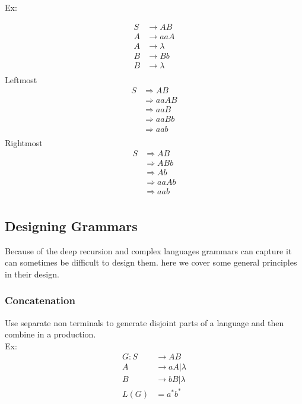 \documentclass[11pt]{exam}
\begin{document}
Ex:
\begin{center}
\begin{align*}
S &\rightarrow AB\\
A &\rightarrow aaA\\
A &\rightarrow \lambda\\
B &\rightarrow Bb\\
B &\rightarrow \lambda\\
\end{align*}
Leftmost
\begin{align*}
S &\Rightarrow AB\\
  &\Rightarrow aaAB\\
  &\Rightarrow aaB\\
  &\Rightarrow aaBb\\
  &\Rightarrow aab\\
\end{align*}
Rightmost
\begin{align*}
S &\Rightarrow AB\\
  &\Rightarrow ABb\\
  &\Rightarrow Ab\\
  &\Rightarrow aaAb\\
  &\Rightarrow aab\\
\end{align*}
\end{center}

\subsection{Designing Grammars}

Because of the deep recursion and complex languages grammars can capture it can sometimes be difficult to design them. here we cover some general principles in their design.\\

\subsubsection{Concatenation}
Use separate non terminals to generate disjoint parts of a language and then combine in a production.\\

Ex:
\begin{align*}
G: S &\rightarrow AB\\
   A &\rightarrow aA | \lambda\\
   B &\rightarrow bB | \lambda\\
   L(G) &= a^*b^*\\
\end{align*}
\end{document}
